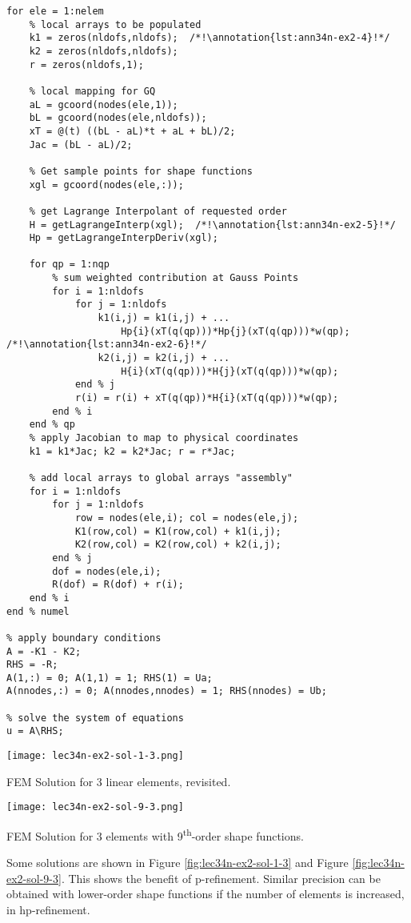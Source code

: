 \begin{lstlisting}[style=myMatlab,name=lec34n-ex2]
% carry out assembly process
for ele = 1:nelem
    % local arrays to be populated
    k1 = zeros(nldofs,nldofs);  /*!\annotation{lst:ann34n-ex2-4}!*/
    k2 = zeros(nldofs,nldofs);
    r = zeros(nldofs,1);
    
    % local mapping for GQ
    aL = gcoord(nodes(ele,1));
    bL = gcoord(nodes(ele,nldofs));
    xT = @(t) ((bL - aL)*t + aL + bL)/2;
    Jac = (bL - aL)/2;

    % Get sample points for shape functions
    xgl = gcoord(nodes(ele,:));
    
    % get Lagrange Interpolant of requested order
    H = getLagrangeInterp(xgl);  /*!\annotation{lst:ann34n-ex2-5}!*/
    Hp = getLagrangeInterpDeriv(xgl);

    for qp = 1:nqp        
        % sum weighted contribution at Gauss Points
        for i = 1:nldofs
            for j = 1:nldofs
                k1(i,j) = k1(i,j) + ...
                    Hp{i}(xT(q(qp)))*Hp{j}(xT(q(qp)))*w(qp); /*!\annotation{lst:ann34n-ex2-6}!*/
                k2(i,j) = k2(i,j) + ...
                    H{i}(xT(q(qp)))*H{j}(xT(q(qp)))*w(qp);
            end % j
            r(i) = r(i) + xT(q(qp))*H{i}(xT(q(qp)))*w(qp);
        end % i     
    end % qp
    % apply Jacobian to map to physical coordinates
    k1 = k1*Jac; k2 = k2*Jac; r = r*Jac;

    % add local arrays to global arrays "assembly"
    for i = 1:nldofs
        for j = 1:nldofs
            row = nodes(ele,i); col = nodes(ele,j);
            K1(row,col) = K1(row,col) + k1(i,j);
            K2(row,col) = K2(row,col) + k2(i,j);
        end % j
        dof = nodes(ele,i);
        R(dof) = R(dof) + r(i);
    end % i
end % numel

% apply boundary conditions
A = -K1 - K2;
RHS = -R;
A(1,:) = 0; A(1,1) = 1; RHS(1) = Ua;
A(nnodes,:) = 0; A(nnodes,nnodes) = 1; RHS(nnodes) = Ub;

% solve the system of equations
u = A\RHS;
\end{lstlisting}
\begin{marginfigure}[-13.0cm]
\texttt{[image: lec34n-ex2-sol-1-3.png]}
\caption{FEM Solution for 3 linear elements, revisited.}
\label{fig:lec34n-ex2-sol-1-3}
\end{marginfigure}

\begin{marginfigure}[-4.0cm]
\texttt{[image: lec34n-ex2-sol-9-3.png]}
\caption{FEM Solution for 3 elements with 9\textsuperscript{th}-order shape functions.}
\label{fig:lec34n-ex2-sol-9-3}
\end{marginfigure}
Some solutions are shown in Figure \ref{fig:lec34n-ex2-sol-1-3} and Figure \ref{fig:lec34n-ex2-sol-9-3}.  This shows the benefit of p-refinement. Similar precision can be obtained with lower-order shape functions if the number of elements is increased, in hp-refinement. 

